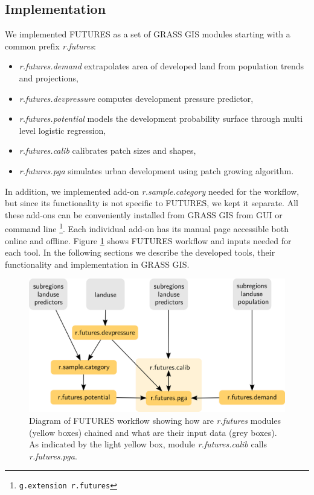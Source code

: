 \documentclass{isprs}
\begin{document}
\subsection{Implementation}
We implemented FUTURES as a set of GRASS GIS modules starting with a common prefix \emph{r.futures}:
\begin{itemize}[noitemsep,nolistsep]
 \item \emph{r.futures.demand} extrapolates area of developed land from population trends and projections,
 \item \emph{r.futures.devpressure} computes development pressure predictor,
 \item \emph{r.futures.potential} models the development probability surface through multi level logistic regression,
 \item \emph{r.futures.calib} calibrates patch sizes and shapes,
 \item \emph{r.futures.pga} simulates urban development using patch growing algorithm.
\end{itemize}
In addition, we implemented add-on \emph{r.sample.category} needed for the workflow, but
since its functionality is not specific to FUTURES, we kept it separate.
All these add-ons can be conveniently installed from GRASS GIS from GUI or command line%
\footnote{\texttt{g.extension r.futures}}. 
Each individual add-on has its manual page accessible both online and offline.
Figure \ref{fig:schemaGRASS} shows FUTURES workflow and inputs needed for each tool.
In the following sections we describe the developed tools, their functionality and implementation in GRASS GIS.


\begin{figure}[h!]
 \centering
 \includegraphics[width=\columnwidth]{./figures/grass_futures_diagram.png}
 \caption{Diagram of FUTURES workflow showing how are \emph{r.futures} modules (yellow boxes) chained 
 and what are their input data (grey boxes). As indicated by the light yellow box,
 module \emph{r.futures.calib} calls \emph{r.futures.pga}.}
 \label{fig:schemaGRASS}
\end{figure}
\end{document}
